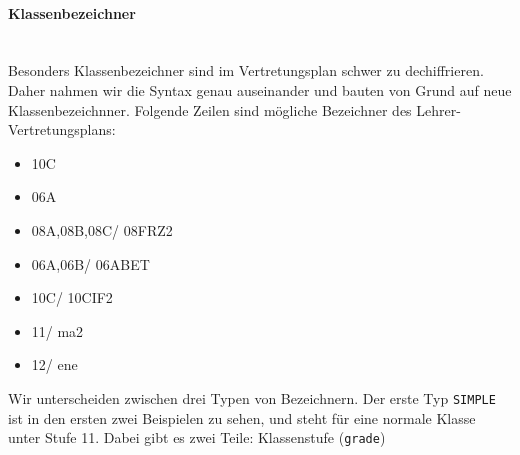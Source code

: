 \paragraph{Klassenbezeichner}\mbox{}\\
Besonders Klassenbezeichner sind im Vertretungsplan schwer zu dechiffrieren. Daher nahmen wir die Syntax
genau auseinander und bauten von Grund auf neue Klassenbezeichnner. Folgende Zeilen sind mögliche Bezeichner
des Lehrer-Vertretungsplans:
\begin{itemize}[itemsep=0pt]
	\ttfamily
	\item[] 10C
	\item[] 06A
	\item[] 08A,08B,08C/ 08FRZ2
	\item[] 06A,06B/ 06ABET
	\item[] 10C/ 10CIF2
	\item[] 11/ ma2
	\item[] 12/ ene
\end{itemize}
Wir unterscheiden zwischen drei Typen von Bezeichnern. Der erste Typ \glqq\texttt{SIMPLE}\grqq{} ist in den ersten zwei
Beispielen zu sehen, und steht für eine normale Klasse unter Stufe 11. Dabei gibt es zwei Teile: Klassenstufe (\texttt{grade})

